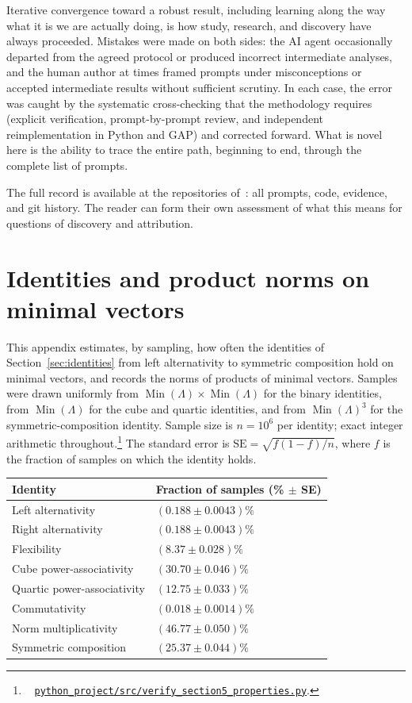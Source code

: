 \documentclass[twoside,english]{paper}
\numberwithin{equation}{section}
\numberwithin{figure}{section}
\theoremstyle{definition}
\theoremstyle{remark}
\newcommand{\LL}{\Lambda}             %
\newcommand{\scriptref}[1]{\cite{repo}~%
  \href{https://github.com/koeplinger/leech\_alg/blob/main/python\_project/src/#1}%
  {\nolinkurl{python_project/src/#1}}}
\begin{document}
Iterative convergence toward a robust result, including learning
along the way what it is we are actually doing, is how study,
research, and discovery have always proceeded.  Mistakes were made
on both sides: the AI agent occasionally departed from the agreed
protocol or produced incorrect intermediate analyses, and the human
author at times framed prompts under misconceptions or accepted
intermediate results without sufficient scrutiny.  In each case, the
error was caught by the systematic cross-checking that the
methodology requires (explicit verification, prompt-by-prompt
review, and independent reimplementation in Python and GAP) and
corrected forward.  What is novel here is the
ability to trace the entire path, beginning to end, through the
complete list of prompts.

The full record is available at the repositories of~\cite{repo}: all
prompts, code, evidence, and git history.  The reader can form
their own assessment of what this means for questions of discovery
and attribution.

\section{Identities and product norms on minimal
vectors}\label{app:samples}

This appendix estimates, by sampling, how often the identities of
Section~\ref{sec:identities} from left alternativity to symmetric
composition hold on minimal vectors, and records the norms of products
of minimal vectors.  Samples were drawn uniformly from
$\operatorname{Min}(\LL) \times \operatorname{Min}(\LL)$ for the
binary identities, from $\operatorname{Min}(\LL)$ for the cube and
quartic identities, and from $\operatorname{Min}(\LL)^3$ for the
symmetric-composition identity.  Sample size is $n = 10^6$ per
identity; exact integer arithmetic
throughout.\footnote{\scriptref{verify\_section5\_properties.py}.}  The
standard error is $\mathrm{SE} = \sqrt{f(1-f)/n}$, where $f$ is the
fraction of samples on which the identity holds.

\begin{center}
\begin{tabular}{@{}ll@{}}
\toprule
Identity & Fraction of samples (\% $\pm$ SE) \\
\midrule
Left alternativity & $(0.188 \pm 0.0043)\%$ \\
Right alternativity & $(0.188 \pm 0.0043)\%$ \\
Flexibility & $(8.37 \pm 0.028)\%$ \\
Cube power-associativity & $(30.70 \pm 0.046)\%$ \\
Quartic power-associativity & $(12.75 \pm 0.033)\%$ \\
Commutativity & $(0.018 \pm 0.0014)\%$ \\
Norm multiplicativity & $(46.77 \pm 0.050)\%$ \\
Symmetric composition & $(25.37 \pm 0.044)\%$ \\
\bottomrule
\end{tabular}
\end{center}
\end{document}
